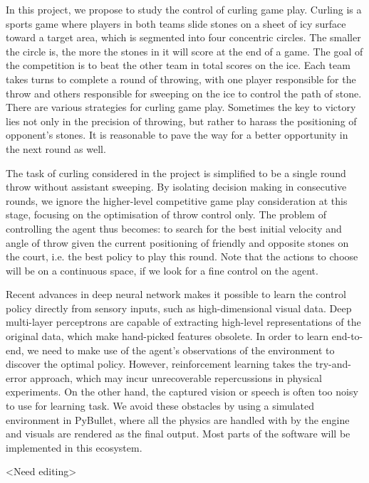 \documentclass[twoside,12pt,a4paper]{article}
\begin{document}
In this project, we propose to study the control of curling game play. Curling is a sports game where players in both teams slide stones on a sheet of icy surface toward a target area, which is segmented into four concentric circles. The smaller the circle is, the more the stones in it will score at the end of a game. The goal of the competition is to beat the other team in total scores on the ice. Each team takes turns to complete a round of throwing, with one player responsible for the throw and others responsible for sweeping on the ice to control the path of stone. There are various strategies for curling game play. Sometimes the key to victory lies not only in the precision of throwing, but rather to harass the positioning of opponent's stones. It is reasonable to pave the way for a better opportunity in the next round as well.

The task of curling considered in the project is simplified to be a single round throw without assistant sweeping. By isolating decision making in consecutive rounds, we ignore the higher-level competitive game play consideration at this stage, focusing on the optimisation of throw control only. The problem of controlling the agent thus becomes: to search for the best initial velocity and angle of throw given the current positioning of friendly and opposite stones on the court, i.e. the best policy to play this round. Note that the actions to choose will be on a continuous space, if we look for a fine control on the agent.

Recent advances in deep neural network makes it possible to learn the control policy directly from sensory inputs, such as high-dimensional visual data. Deep multi-layer perceptrons are capable of extracting high-level representations of the original data, which make hand-picked features obsolete. In order to learn end-to-end, we need to make use of the agent's observations of the environment to discover the optimal policy. However, reinforcement learning takes the try-and-error approach, which may incur unrecoverable repercussions in physical experiments. On the other hand, the captured vision or speech is often too noisy to use for learning task. We avoid these obstacles by using a simulated environment in PyBullet, where all the physics are handled with by the engine and visuals are rendered as the final output. Most parts of the software will be implemented in this ecosystem.

<Need editing>
\end{document}
